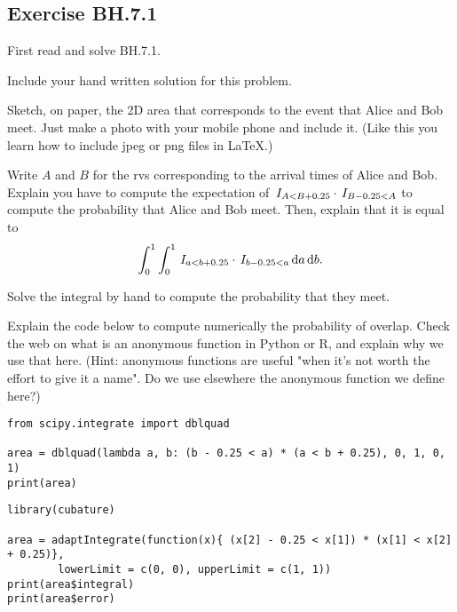 \subsection{Exercise BH.7.1}
\label{sec:bh.7.1}

First read and solve BH.7.1.

\begin{exercise}
Include your hand written solution for this problem.
\end{exercise}


\begin{exercise}\label{ex:ab}
Sketch, on paper, the 2D area that corresponds to the event that Alice and Bob meet. Just make a photo with your mobile phone and include it. (Like this you learn how to include jpeg or png files in \LaTeX.)
\end{exercise}

\begin{exercise}
Write $A$ and $B$ for the rvs corresponding to the arrival times of Alice and Bob.
Explain  you have to compute the expectation of  $\,I_{A<B+0.25}\cdot\,I_{B-0.25 < A}$
to compute the probability that Alice and Bob meet.
Then,  explain that it is equal to
\begin{equation}
\int_0^1\int_0^1 \,I_{a<b+0.25}\cdot \,I_{b-0.25 < a} \,\textrm{d}a \,\textrm{d}b.
\end{equation}
\end{exercise}

\begin{exercise}
Solve the integral by hand to compute  the probability that they meet.
\end{exercise}

\begin{exercise}
Explain the  code below to compute numerically the probability of overlap. Check the web on what is an anonymous function in Python or R, and explain why we use that here.
(Hint: anonymous functions are useful "when it’s not worth the effort to give it a name". Do we use elsewhere the anonymous function we define here?)
\begin{verbatim}
from scipy.integrate import dblquad

area = dblquad(lambda a, b: (b - 0.25 < a) * (a < b + 0.25), 0, 1, 0, 1)
print(area)
\end{verbatim}

\begin{verbatim}
library(cubature)

area = adaptIntegrate(function(x){ (x[2] - 0.25 < x[1]) * (x[1] < x[2] + 0.25)},
        lowerLimit = c(0, 0), upperLimit = c(1, 1))
print(area$integral)
print(area$error)
\end{verbatim}
\end{exercise}

